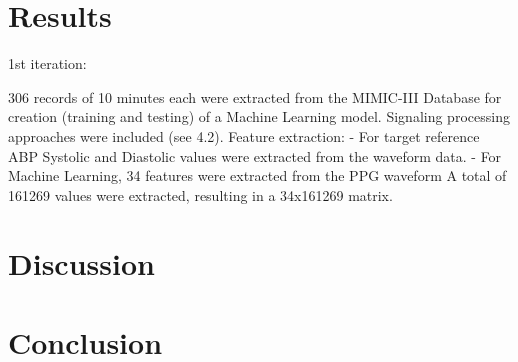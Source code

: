 \documentclass[12pt, bibliography=totoc]{scrartcl}
\begin{document}
\section{Results}
\label{sec:results}

1st iteration:

306 records of 10 minutes each were extracted from the MIMIC-III Database for creation (training and testing) of a Machine Learning model.
Signaling processing approaches were included (see 4.2).
Feature extraction:
- For target reference ABP Systolic and Diastolic values were extracted from the waveform data.
- For Machine Learning, 34 features were extracted from the PPG waveform
A total of 161269 values were extracted, resulting in a 34x161269 matrix.


\section{Discussion}
\label{sec:discussion}

\section{Conclusion}
\label{sec:conclusion}



\end{document}
